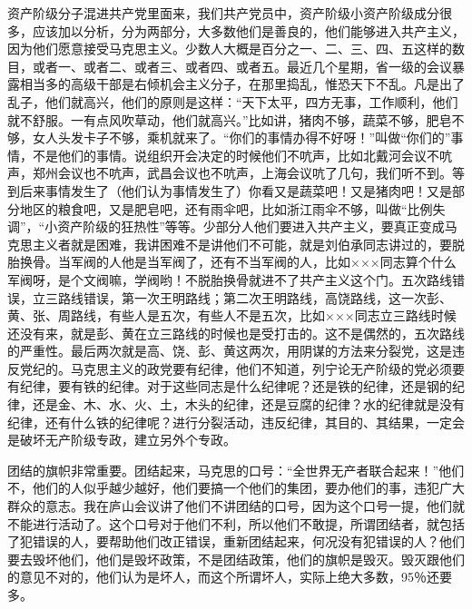 资产阶级分子混进共产党里面来，我们共产党员中，资产阶级小资产阶级成分很多，应该加以分析，分为两部分，大多数他们是善良的，他们能够进入共产主义，因为他们愿意接受马克思主义。少数人大概是百分之一、二、三、四、五这样的数目，或者一、或者二、或者三、或者四、或者五。最近几个星期，省一级的会议暴露相当多的高级干部是右倾机会主义分子，在那里捣乱，惟恐天下不乱。凡是出了乱子，他们就高兴，他们的原则是这样：“天下太平，四方无事，工作顺利，他们就不舒服。一有点风吹草动，他们就高兴。”比如讲，猪肉不够，蔬菜不够，肥皂不够，女人头发卡子不够，乘机就来了。“你们的事情办得不好呀！”叫做“你们的”事情，不是他们的事情。说组织开会决定的时候他们不吭声，比如北戴河会议不吭声，郑州会议也不吭声，武昌会议也不吭声，上海会议吭了几句，我们听不到。等到后来事情发生了（他们认为事情发生了）你看又是蔬菜吧！又是猪肉吧！又是部分地区的粮食吧，又是肥皂吧，还有雨伞吧，比如浙江雨伞不够，叫做“比例失调”，“小资产阶级的狂热性”等等。少部分人他们要进入共产主义，要真正变成马克思主义者就是困难，我讲困难不是讲他们不可能，就是刘伯承同志讲过的，要脱胎换骨。当军阀的人他是当军阀了，还有不当军阀的人，比如×××同志算个什么军阀呀，是个文阀嘛，学阀哟！不脱胎换骨就进不了共产主义这个门。五次路线错误，立三路线错误，第一次王明路线；第二次王明路线，高饶路线，这一次彭、黄、张、周路线，有些人是五次，有些人不是五次，比如×××同志立三路线时候还没有来，就是彭、黄在立三路线的时候也是受打击的。这不是偶然的，五次路线的严重性。最后两次就是高、饶、彭、黄这两次，用阴谋的方法来分裂党，这是违反党纪的。马克思主义的政党要有纪律，他们不知道，列宁论无产阶级的党必须要有纪律，要有铁的纪律。对于这些同志是什么纪律呢？还是铁的纪律，还是钢的纪律，还是金、木、水、火、土，木头的纪律，还是豆腐的纪律？水的纪律就是没有纪律，还有什么铁的纪律呢？进行分裂活动，违反纪律，其目的、其结果，一定会是破坏无产阶级专政，建立另外个专政。

团结的旗帜非常重要。团结起来，马克思的口号：“全世界无产者联合起来！”他们不，他们的人似乎越少越好，他们要搞一个他们的集团，要办他们的事，违犯广大群众的意志。我在庐山会议讲了他们不讲团结的口号，因为这个口号一提，他们就不能进行活动了。这个口号对于他们不利，所以他们不敢提，所谓团结者，就包括了犯错误的人，要帮助他们改正错误，重新团结起来，何况没有犯错误的人？他们要去毁坏他们，他们是毁坏政策，不是团结政策，他们的旗帜是毁灭。毁灭跟他们的意见不对的，他们认为是坏人，而这个所谓坏人，实际上绝大多数，95％还要多。

